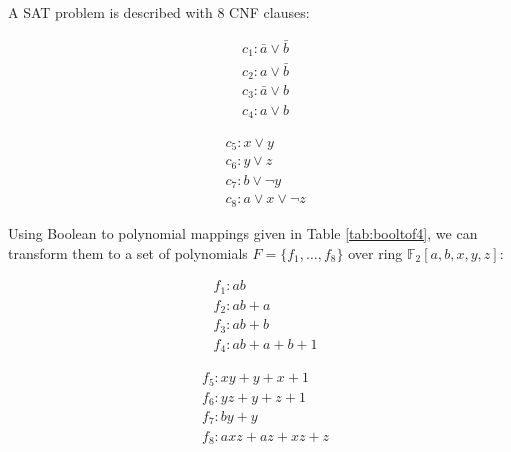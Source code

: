 \begin{Example}
A SAT problem is described with 8 CNF clauses:

\begin{minipage}[h]{0.3\textwidth}
\begin{align*}
&c_1: \bar{a}\lor\bar{b}\\
&c_2: a\lor\bar{b}\\
&c_3: \bar{a}\lor b\\
&c_4: a\lor b
\end{align*}
\end{minipage}
\begin{minipage}[h]{0.7\textwidth}
\begin{align*}
&c_5: x\lor y\\
&c_6: y\lor z\\
&c_7: b\lor \neg y\\
&c_8: a\lor x\lor \neg z
\end{align*}
\end{minipage}

\vspace{0.1in}
Using Boolean to polynomial mappings given in Table \ref{tab:booltof4}, we can transform them to a set of
polynomials $F=\{f_1,\dots,f_8\}$ over ring $\mathbb F_2[a,b,x,y,z]$:

\begin{minipage}[h]{0.4\textwidth}
\begin{align*}
&f_1:ab\\
&f_2:ab+a\\
&f_3:ab+b\\
&f_4:ab+a+b+1
\end{align*}
\end{minipage}
\begin{minipage}[h]{0.6\textwidth}
\begin{align*}
&f_5:xy+y+x+1\\
&f_6:yz+y+z+1\\
&f_7:by+y\\
&f_8:axz+az+xz+z
\end{align*}
\end{minipage}


\end{Example}
